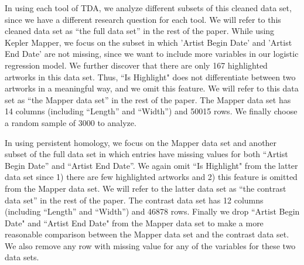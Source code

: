 \documentclass[12pt]{article}
\theoremstyle{definition}
\begin{document}
In using each tool of TDA, we analyze different subsets of this cleaned data set, since we have a different research question for each tool. We will refer to this cleaned data set as ``the full data set'' in the rest of the paper. While using Kepler Mapper, we focus on the subset in which 'Artist Begin Date' and 'Artist End Date' are not missing, since we want to include more variables in our logistic regression model. We further discover that there are only 167 highlighted artworks in this data set. Thus, ``Is Highlight" does not differentiate between two artworks in a meaningful way, and we omit this feature. We will refer to this data set as ``the Mapper data set'' in the rest of the paper. The Mapper data set has 14 columns (including ``Length'' and ``Width'') and 50015 rows. We finally choose a random sample of 3000 to analyze. 
\newline
\par In using persistent homology, we focus on the Mapper data set and another subset of the full data set in which entries have missing values for both ``Artist Begin Date'' and ``Artist End Date''. We again omit ``Is Highlight" from the latter data set since 1) there are few highlighted artworks and 2) this feature is omitted from the Mapper data set. We will refer to the latter data set as ``the contrast data set'' in the rest of the paper. The contrast data set has 12 columns (including ``Length'' and ``Width'') and 46878 rows. Finally we drop ``Artist Begin Date" and ``Artist End Date" from the Mapper data set to make a more reasonable comparison between the Mapper data set and the contrast data set. We also remove any row with missing value for any of the variables for these two data sets.
\end{document}
